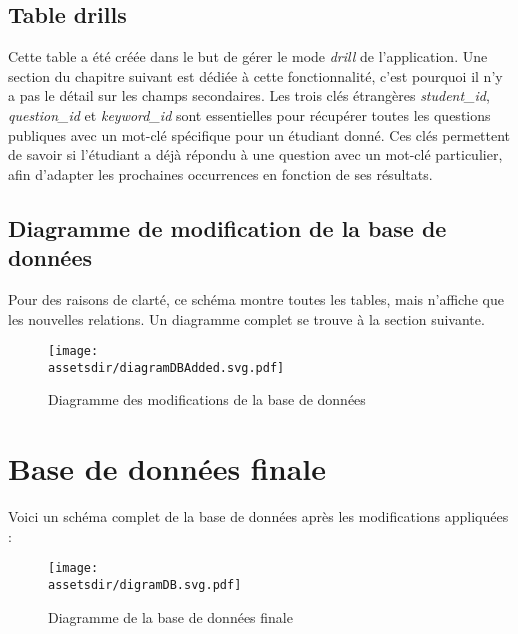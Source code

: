 \subsection{Table drills}
Cette table a été créée dans le but de gérer le mode \emph{drill} de l'application. Une section du chapitre suivant est dédiée à cette fonctionnalité, c'est pourquoi il n'y a pas le détail sur les champs secondaires. Les trois clés étrangères \emph{student\_id}, \emph{question\_id} et \emph{keyword\_id} sont essentielles pour récupérer toutes les questions publiques avec un mot-clé spécifique pour un étudiant donné. Ces clés permettent de savoir si l'étudiant a déjà répondu à une question avec un mot-clé particulier, afin d'adapter les prochaines occurrences en fonction de ses résultats.

\subsection{Diagramme de modification de la base de données}
Pour des raisons de clarté, ce schéma montre toutes les tables, mais n'affiche que les nouvelles relations. Un diagramme complet se trouve à la section suivante.

\begin{figure}[H]
    \begin{center}
        \texttt{[image: \\assetsdir/diagramDBAdded.svg.pdf]}
    \end{center}
    \caption[Diagramme des modifications de la base de données]{\label{assembly}Diagramme des modifications de la base de données}
\end{figure}

\section{Base de données finale}
Voici un schéma complet de la base de données après les modifications appliquées :
\begin{figure}[H]
    \begin{center}
        \texttt{[image: \\assetsdir/digramDB.svg.pdf]}
    \end{center}
    \caption[Diagramme de la base de données finale]{\label{assembly}Diagramme de la base de données finale}
\end{figure}